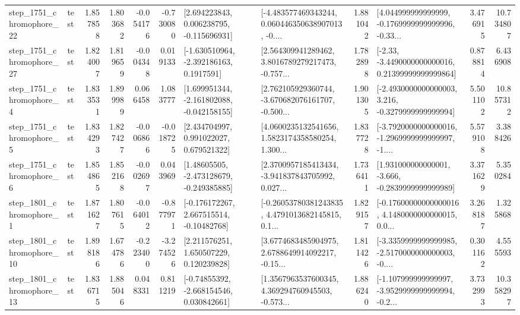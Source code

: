 \begin{tabular}{llrrrrllrlrr}
 step\_1751\_chromophore\_22 &      test &      1.857858 &    1.803682 &     -0.054176 & -0.730080 &    [2.694223843, 0.006238795, -0.115696931] &  [-4.483577469343244, 0.060446350638907013, -0.... &       1.881042 &  [4.044999999999999, -0.1769999999999996, -0.33... &            3.476915 &         10.734807 \\
 step\_1751\_chromophore\_27 &      test &      1.824007 &    1.819659 &     -0.004348 &  0.019133 &     [-1.630510964, -2.392186163, 0.1917591] &  [2.564309941289462, 3.8016789279217473, -0.757... &       1.782898 &  [-2.33, -3.4490000000000016, 0.21399999999999864] &            0.878814 &          6.436908 \\
  step\_1751\_chromophore\_4 &      test &      1.833531 &    1.899989 &      0.066458 &  1.083777 &   [1.699951344, -2.161802088, -0.042158155] &  [2.762105929360744, -3.670682076161707, -0.500... &       1.901305 &  [-2.4930000000000003, 3.216, -0.3279999999999994] &            5.501102 &         10.857312 \\
  step\_1751\_chromophore\_5 &      test &      1.834293 &    1.827427 &     -0.006866 & -0.018725 &     [2.434704997, 0.991022027, 0.679521322] &  [4.0600235132541656, 1.5823174358580254, 1.300... &       1.837728 &  [-3.7920000000000016, -1.2969999999999997, -1.... &            5.579108 &          3.388426 \\
  step\_1751\_chromophore\_6 &      test &      1.854865 &    1.852168 &     -0.002697 &  0.043969 &    [1.48605505, -2.473128679, -0.249385885] &  [2.3700957185413434, -3.941837843705992, 0.027... &       1.736411 &   [1.931000000000001, -3.666, -0.2839999999999989] &            3.371629 &          5.350284 \\
  step\_1801\_chromophore\_1 &      test &      1.871627 &    1.807615 &     -0.064012 & -0.877971 &    [-0.176172267, 2.667515514, -0.10482768] &  [-0.26053780381243835, 4.4791013682145815, 0.1... &       1.829157 &  [-0.17600000000000016, 4.1480000000000015, 0.0... &            3.268187 &          1.325868 \\
 step\_1801\_chromophore\_10 &      test &      1.898186 &    1.674786 &     -0.223400 & -3.274526 &     [2.211576251, 1.650507229, 0.120239828] &  [3.6774683485904975, 2.6788649914092217, -0.15... &       1.811426 &  [-3.3359999999999985, -2.5170000000000003, -0.... &            0.301162 &          4.555593 \\
 step\_1801\_chromophore\_13 &      test &      1.836715 &    1.885046 &      0.048331 &  0.811219 &    [-0.74855392, -2.668154546, 0.030842661] &  [1.3567963537600345, 4.369294760945503, -0.573... &       1.886240 &  [-1.107999999999997, -3.9529999999999994, -0.2... &            3.732993 &         10.358297 \\

\end{tabular}
